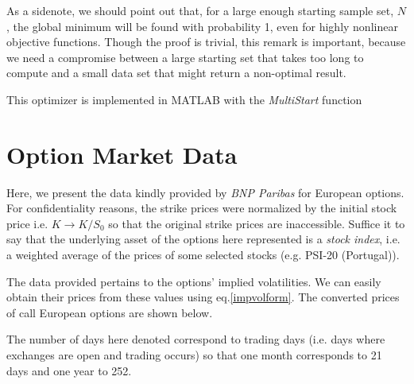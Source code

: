 As a sidenote, we should point out that, for a large enough starting sample set, $N$, the global minimum will be found with probability 1, even for highly nonlinear objective functions. Though the proof is trivial, this remark is important, because we need a compromise between a large starting set that takes too long to compute and a small data set that might return a non-optimal result.


This optimizer is implemented in MATLAB with the \emph{MultiStart} function~\cite{MATLABMS}











\chapter{Option Market Data}
\label{chapter:mktdata}

Here, we present the data kindly provided by \emph{BNP Paribas} for European options. For confidentiality reasons, the strike prices were normalized by the initial stock price i.e. $K\rightarrow K/S_0$ so that the original strike prices are inaccessible.
Suffice it to say that the underlying asset of the options here represented is a \emph{stock index}, i.e. a weighted average of the prices of some selected stocks (e.g. PSI-20 (Portugal)).

The data provided pertains to the options' implied volatilities. We can easily obtain their prices from these values using eq.\eqref{impvolform}. The converted prices of call European options are shown below.

The number of days here denoted correspond to trading days (i.e. days where exchanges are open and trading occurs) so that one month corresponds to 21 days and one year to 252.

